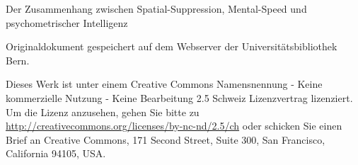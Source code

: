 \documentclass[11pt, twoside, a4paper]{book}		%
\begin{document}
\layout								%
\frontmatter						%


\begin{titlepage}

	\centering
		\huge Der Zusammenhang zwischen Spatial-Suppression, Mental-Speed und psychometrischer Intelligenz 
	
	\noindent\makebox[\textwidth]{\rule{\textwidth}{0.4pt}}
	
	\vspace{1.2cm}
	

		\vspace*{\fill}
		\small
	\flushleft Originaldokument gespeichert auf dem Webserver der Universitätsbibliothek Bern.

	\vspace{.2cm}
	\vspace{0cm}

	\RaggedRight Dieses Werk ist unter einem Creative Commons Namensnennung - Keine kommerzielle Nutzung - Keine Bearbeitung 2.5 Schweiz Lizenzvertrag lizenziert. Um die Lizenz anzusehen, gehen Sie bitte zu \url{http://creativecommons.org/licenses/by-nc-nd/2.5/ch} oder schicken Sie einen Brief an Creative Commons, 171 Second Street, Suite 300, San Francisco, California 94105, USA.


\end{titlepage}
\end{document}
